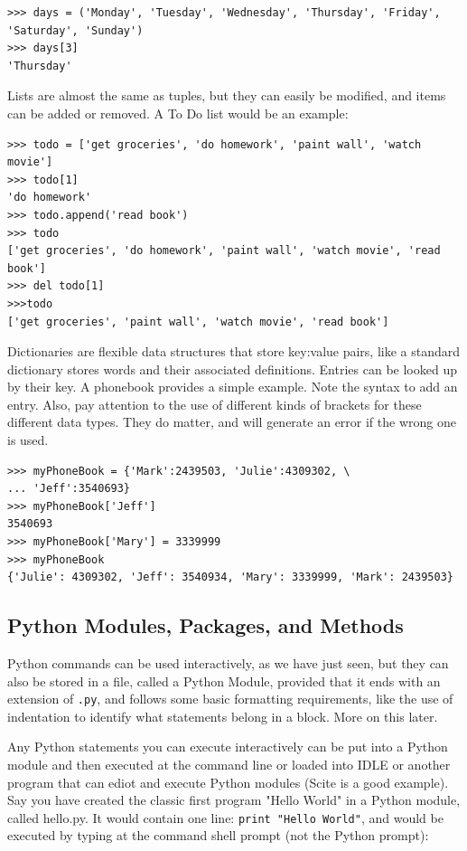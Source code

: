 \begin{lstlisting}
>>> days = ('Monday', 'Tuesday', 'Wednesday', 'Thursday', 'Friday', 'Saturday', 'Sunday')
>>> days[3]
'Thursday'
\end{lstlisting}

Lists are almost the same as tuples, but they can easily be modified, and items can be added or removed. A To Do list would be an example:

\begin{lstlisting}
>>> todo = ['get groceries', 'do homework', 'paint wall', 'watch movie']
>>> todo[1]
'do homework'
>>> todo.append('read book')
>>> todo
['get groceries', 'do homework', 'paint wall', 'watch movie', 'read book']
>>> del todo[1]
>>>todo
['get groceries', 'paint wall', 'watch movie', 'read book']
\end{lstlisting}

Dictionaries are flexible data structures that store key:value pairs, like a standard dictionary stores words and their associated definitions.  Entries can be looked up by their key.  A phonebook provides a simple example.  Note the syntax to add an entry.  Also, pay attention to the use of different kinds of brackets for these different data types.  They do matter, and will generate an error if the wrong one is used.

\begin{lstlisting}
>>> myPhoneBook = {'Mark':2439503, 'Julie':4309302, \
... 'Jeff':3540693}
>>> myPhoneBook['Jeff']
3540693
>>> myPhoneBook['Mary'] = 3339999
>>> myPhoneBook
{'Julie': 4309302, 'Jeff': 3540934, 'Mary': 3339999, 'Mark': 2439503}
\end{lstlisting}

\subsection{Python Modules, Packages, and Methods}

Python commands can be used interactively, as we have just seen,  but they can also be stored in a file, called a Python Module, provided that it ends with an extension of \verb#.py#, and follows some basic formatting requirements, like the use of indentation to identify what statements belong in a block.  More on this later.

Any Python statements you can execute interactively can be put into a Python module and then executed at the command line or loaded into IDLE or another program that can ediot and execute Python modules (Scite is a good example).  Say you have created the classic first program "Hello World" in a Python module, called hello.py.  It would contain one line: \verb#print "Hello World"#, and would be executed by typing at the command shell prompt (not the Python prompt):

